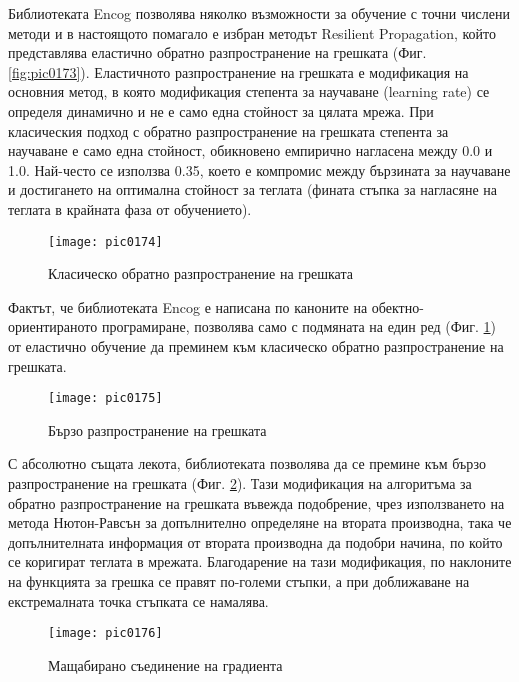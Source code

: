 Библиотеката Encog позволява няколко възможности за обучение с точни числени методи и в настоящото помагало  е избран методът Resilient Propagation, който представлява еластично обратно разпространение на грешката (Фиг. \ref{fig:pic0173}). Еластичното разпространение на грешката е модификация на основния метод, в която модификация степента за научаване (learning rate) се определя динамично и не е само една стойност за цялата мрежа. При класическия подход с обратно разпространение на грешката степента за научаване е само една стойност, обикновено емпирично нагласена между 0.0 и 1.0. Най-често се използва 0.35, което е компромис между бързината за научаване и достигането на оптимална стойност за теглата (фината стъпка за нагласяне на теглата в крайната фаза от обучението).

\begin{figure}[h]
  \centering
  \texttt{[image: pic0174]}
  \caption{Класическо обратно разпространение на грешката}
\label{fig:pic0174}
\end{figure}
\FloatBarrier

Фактът, че библиотеката Encog е написана по каноните на обектно-ориентираното програмиране, позволява само с подмяната на един ред (Фиг. \ref{fig:pic0174}) от еластично обучение да преминем към класическо обратно разпространение на грешката. 

\begin{figure}[h]
  \centering
  \texttt{[image: pic0175]}
  \caption{Бързо разпространение на грешката}
\label{fig:pic0175}
\end{figure}
\FloatBarrier

С абсолютно същата лекота, библиотеката позволява да се премине към бързо разпространение на грешката (Фиг. \ref{fig:pic0175}). Тази модификация на алгоритъма за обратно разпространение на грешката въвежда подобрение, чрез използването на метода Нютон-Равсън за допълнително определяне на втората производна, така че допълнителната информация от втората производна да подобри начина, по който се коригират теглата в мрежата. Благодарение на тази модификация, по наклоните на функцията за грешка се правят по-големи стъпки, а при доближаване на екстремалната точка стъпката се намалява. 

\begin{figure}[h]
  \centering
  \texttt{[image: pic0176]}
  \caption{Мащабирано съединение на градиента}
\label{fig:pic0176}
\end{figure}
\FloatBarrier

